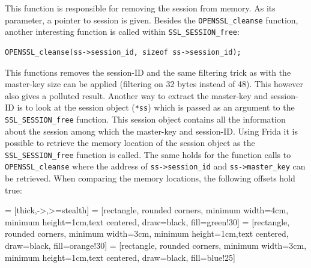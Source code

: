 \documentclass[12pt, a4paper]{report}
\begin{document}
This function is responsible for removing the session from memory. As its parameter, a pointer to session is given. Besides the \texttt{OPENSSL\_cleanse} function, another interesting function is called within \texttt{SSL\_SESSION\_free}:
\\
\begin{lstlisting}[frame=single, breaklines=true]
OPENSSL_cleanse(ss->session_id, sizeof ss->session_id);
\end{lstlisting}

This functions removes the session-ID and the same filtering trick as with the master-key size can be applied (filtering on 32 bytes instead of 48). This however also gives a polluted result.
\newline
\newline
\noindent Another way to extract the master-key and session-ID is to look at the session object (\texttt{*ss}) which is passed as an argument to the \texttt{SSL\_SESSION\_free} function. This session object contains all the information about the session among which the master-key and session-ID. Using Frida it is possible to retrieve the memory location of the session object as the \texttt{SSL\_SESSION\_free} function is called. The same holds for the function calls to \texttt{OPENSSL\_cleanse} where the address of \texttt{ss->session\_id} and \texttt{ss->master\_key} can be retrieved. When comparing the memory locations, the following offsets hold true:

 = [thick,->,>=stealth]
 = [rectangle, rounded corners, minimum width=4cm, minimum height=1cm,text centered, draw=black, fill=green!30]
 = [rectangle, rounded corners, minimum width=3cm, minimum height=1cm,text centered, draw=black, fill=orange!30]
 = [rectangle, rounded corners, minimum width=3cm, minimum height=1cm,text centered, draw=black, fill=blue!25]
\end{document}

